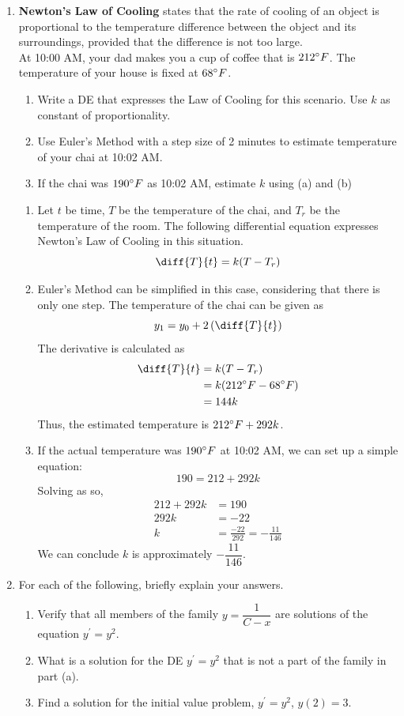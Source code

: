 \documentclass{article}
\begin{document}
\begin{enumerate}[label=\textbf{(1.\arabic*)}]
\newpage

\item \textbf{Newton's Law of Cooling} states that the rate of cooling of an object is proportional to the temperature difference between the object and its surroundings, provided that the difference is not too large.\\
At 10:00 AM, your dad makes you a cup of coffee that is $212\degree F$. The temperature of your house is fixed at $68\degree F$.
\begin{enumerate}
\item Write a DE that expresses the Law of Cooling for this scenario. Use $k$ as constant of proportionality.
\item Use Euler's Method with a step size of 2 minutes to estimate temperature of your chai at 10:02 AM.
\item If the chai was $190\degree F$ as 10:02 AM, estimate $k$ using (a) and (b)
\end{enumerate}
\vspace{10pt}
\begin{enumerate}
\item Let $t$ be time, $T$ be the temperature of the chai, and $T_r$ be the temperature of the room. The following differential equation expresses Newton's Law of Cooling in this situation.
\[\diff{T}{t} = k(T-T_r)\]
\item Euler's Method can be simplified in this case, considering that there is only one step. The temperature of the chai can be given as 
\[y_1=y_0+2\left(\diff{T}{t}\right)\]
The derivative is calculated as 
\begin{align*}
\diff{T}{t} &= k(T-T_r)\\
&= k(212\degree F - 68\degree F)\\
&= 144k
\end{align*}
Thus, the estimated temperature is $212\degree F + 292k$.
\item If the actual temperature was $190\degree F$ at 10:02 AM, we can set up a simple equation:
\[190 = 212 +292k\]
Solving as so,
\begin{align*}
212 +292k&= 190\\
292k &= -22\\
k &= \frac{-22}{292} = -\frac{11}{146}
\end{align*}
We can conclude $k$ is approximately $-\dfrac{11}{146}$.
\end{enumerate}

\newpage

\item For each of the following, briefly explain your answers.
\begin{enumerate}
\item Verify that all members of the family $y=\dfrac{1}{C-x}$ are solutions of the equation $y^\prime = y^2$.
\item What is a solution for the DE $y^\prime = y^2$ that is not a part of the family in part (a).
\item Find a solution for the initial value problem, $y^\prime =y^2$, $y(2)=3$.
\end{enumerate}


\end{enumerate}
\end{document}
